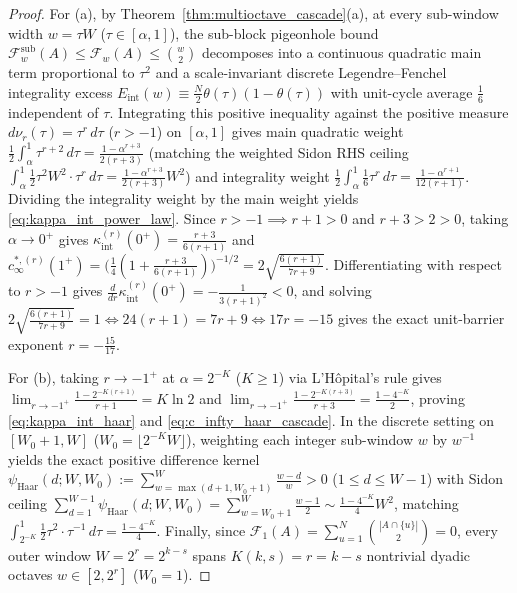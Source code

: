 \documentclass[11pt,reqno]{amsart}
\theoremstyle{definition}
\theoremstyle{remark}
\begin{document}
\begin{proof}
For (a), by Theorem~\ref{thm:multioctave_cascade}(a), at every sub-window width $w = \tau W$ ($\tau \in [\alpha, 1]$), the sub-block pigeonhole bound $\mathcal{F}_w^{\mathrm{sub}}(A) \le \mathcal{F}_w(A) \le \binom{w}{2}$ decomposes into a continuous quadratic main term proportional to $\tau^2$ and a scale-invariant discrete Legendre--Fenchel integrality excess $E_{\mathrm{int}}(w) \equiv \frac{N}{2}\theta(\tau)(1 - \theta(\tau))$ with unit-cycle average $\frac{1}{6}$ independent of $\tau$. Integrating this positive inequality against the positive measure $d\nu_r(\tau) = \tau^r\,d\tau$ ($r > -1$) on $[\alpha, 1]$ gives main quadratic weight $\frac{1}{2}\int_\alpha^1 \tau^{r+2}\,d\tau = \frac{1 - \alpha^{r+3}}{2(r+3)}$ (matching the weighted Sidon RHS ceiling $\int_\alpha^1 \frac{1}{2}\tau^2 W^2 \cdot \tau^r\,d\tau = \frac{1 - \alpha^{r+3}}{2(r+3)}W^2$) and integrality weight $\frac{1}{2}\int_\alpha^1 \frac{1}{6}\tau^r\,d\tau = \frac{1 - \alpha^{r+1}}{12(r+1)}$. Dividing the integrality weight by the main weight yields \eqref{eq:kappa_int_power_law}. Since $r > -1 \implies r + 1 > 0$ and $r + 3 > 2 > 0$, taking $\alpha \to 0^+$ gives $\kappa_{\mathrm{int}}^{(r)}(0^+) = \frac{r+3}{6(r+1)}$ and $c_\infty^{*,(r)}(1^+) = \bigl(\frac{1}{4}(1 + \frac{r+3}{6(r+1)})\bigr)^{-1/2} = 2\sqrt{\frac{6(r+1)}{7r+9}}$. Differentiating with respect to $r > -1$ gives $\frac{d}{dr}\kappa_{\mathrm{int}}^{(r)}(0^+) = -\frac{1}{3(r+1)^2} < 0$, and solving $2\sqrt{\frac{6(r+1)}{7r+9}} = 1 \iff 24(r+1) = 7r + 9 \iff 17r = -15$ gives the exact unit-barrier exponent $r = -\frac{15}{17}$.

For (b), taking $r \to -1^+$ at $\alpha = 2^{-K}$ ($K \ge 1$) via L'H\^opital's rule gives $\lim_{r \to -1^+} \frac{1 - 2^{-K(r+1)}}{r + 1} = K \ln 2$ and $\lim_{r \to -1^+} \frac{1 - 2^{-K(r+3)}}{r + 3} = \frac{1 - 4^{-K}}{2}$, proving \eqref{eq:kappa_int_haar} and \eqref{eq:c_infty_haar_cascade}. In the discrete setting on $[W_0 + 1, W]$ ($W_0 = \lfloor 2^{-K}W \rfloor$), weighting each integer sub-window $w$ by $w^{-1}$ yields the exact positive difference kernel $\psi_{\mathrm{Haar}}(d; W, W_0) := \sum_{w = \max(d+1, W_0+1)}^W \frac{w - d}{w} > 0$ ($1 \le d \le W - 1$) with Sidon ceiling $\sum_{d=1}^{W-1} \psi_{\mathrm{Haar}}(d; W, W_0) = \sum_{w=W_0+1}^W \frac{w - 1}{2} \sim \frac{1 - 4^{-K}}{4}W^2$, matching $\int_{2^{-K}}^1 \frac{1}{2}\tau^2 \cdot \tau^{-1}\,d\tau = \frac{1 - 4^{-K}}{4}$. Finally, since $\mathcal{F}_1(A) = \sum_{u=1}^N \binom{|A \cap \{u\}|}{2} = 0$, every outer window $W = 2^r = 2^{k-s}$ spans $K(k, s) = r = k - s$ nontrivial dyadic octaves $w \in [2, 2^r]$ ($W_0 = 1$).
\end{proof}
\end{document}
